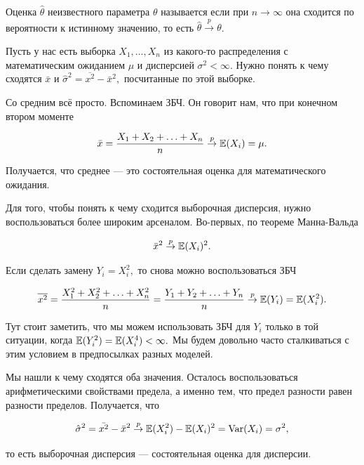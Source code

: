 \documentclass[12pt, a4paper, oneside]{article}
\begin{document}
\begin{definition} 
Оценка $\hat \theta$ неизвестного параметра $\theta$ называется  если при $n \to \infty$ она сходится по вероятности к истинному значению, то есть $\hat \theta  \overset{p}{\to} \theta$. 
\end{definition}

\begin{problem}{ } 
Пусть у нас есть выборка $X_1, \ldots, X_n$ из какого-то распределения с математическим ожиданием $\mu$ и дисперсией $\sigma^2 < \infty$. Нужно понять к чему сходятся $\bar x$ и $\hat \sigma^2 = \overline{x^2} - \bar{x}^2,$ посчитанные по этой выборке.
\end{problem} 

\begin{sol}
Со средним всё просто. Вспоминаем ЗБЧ. Он говорит нам, что при конечном втором моменте

$$
\bar x = \frac{X_1 + X_2 + \ldots + X_n}{n} \overset{p}{\to} \mathbb{E}(X_i) = \mu.
$$

Получается, что среднее --- это состоятельная оценка для математического ожидания. 

Для того, чтобы понять к чему сходится выборочная дисперсия, нужно воспользоваться более широким арсеналом. Во-первых, по теореме Манна-Вальда 

$$
\bar{x}^2 \overset{p}{\to} \mathbb{E}(X_i)^2.
$$

Если сделать замену $Y_i = X_i^2,$ то снова можно воспользоваться ЗБЧ

$$
\overline{x^2} = \frac{X_1^2 + X_2^2 + \ldots + X_n^2}{n} = \frac{Y_1 + Y_2 + \ldots + Y_n}{n} \overset{p}{\to} \mathbb{E}(Y_i) = \mathbb{E}(X_i^2).
$$

Тут стоит заметить, что мы можем использовать ЗБЧ для $Y_i$ только в той ситуации, когда $\mathbb{E}(Y_i^2) = \mathbb{E}(X_i^4) < \infty.$ Мы будем довольно часто сталкиваться с этим условием в предпосылках разных моделей. 

Мы нашли к чему сходятся оба значения. Осталось воспользоваться арифметическими свойствами предела, а именно тем, что предел разности равен разности пределов. Получается, что 

$$
\hat \sigma^2 = \bar{x^2} - \bar{x}^2 \overset{p}{\to} \mathbb{E}(X_i^2) - \mathbb{E}(X_i)^2 = \operatorname{Var}(X_i) = \sigma^2,
$$

то есть выборочная дисперсия --- состоятельная оценка для дисперсии.
\end{sol} 
\end{document}
